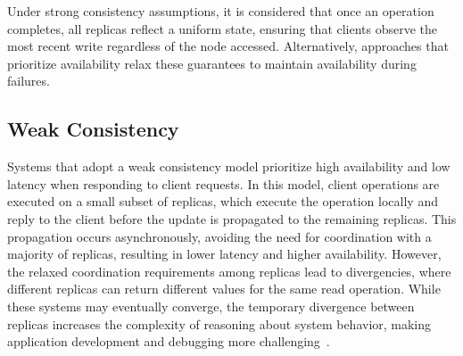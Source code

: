 Under strong consistency assumptions, it is considered that once an operation completes, all replicas reflect a uniform state, ensuring that clients observe the most recent write regardless of the node accessed. Alternatively, approaches that prioritize availability relax these guarantees to maintain availability during failures.

\subsection{Weak Consistency}
\label{sub:weak}

Systems that adopt a weak consistency model prioritize high availability and low latency when responding to client requests. In this model, client operations are executed on a small subset of replicas, which execute the operation locally and reply to the client before the update is propagated to the remaining replicas. This propagation occurs asynchronously, avoiding the need for coordination with a majority of replicas, resulting in lower latency and higher availability. However, the relaxed coordination requirements among replicas lead to divergencies, where different replicas can return different values for the same read operation. While these systems may eventually converge, the temporary divergence between replicas increases the complexity of reasoning about system behavior, making application development and debugging more challenging~\cite{preguica2018overview}.

